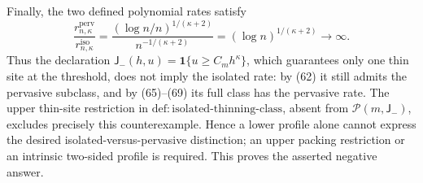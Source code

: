 Finally, the two defined polynomial rates satisfy
\[
 \frac{r_{n,\kappa}^{\mathrm{perv}}}
 {r_{n,\kappa}^{\mathrm{iso}}}
 =\frac{(\log n/n)^{1/(\kappa+2)}}{n^{-1/(\kappa+2)}}
 =(\log n)^{1/(\kappa+2)}\longrightarrow\infty. \tag{70}
\]
Thus the declaration \(\mathsf J_{-}(h,u)=\mathbf 1\{u\ge C_mh^\kappa\}\), which guarantees only one thin site at the threshold, does not imply the isolated rate: by (62) it still admits the pervasive subclass, and by (65)--(69) its full class has the pervasive rate.  The upper thin-site restriction in \(\mathrm{def:isolated\text{-}thinning\text{-}class}\), absent from \(\mathcal P(m,\mathsf J_{-})\), excludes precisely this counterexample.  Hence a lower profile alone cannot express the desired isolated-versus-pervasive distinction; an upper packing restriction or an intrinsic two-sided profile is required.  This proves the asserted negative answer.